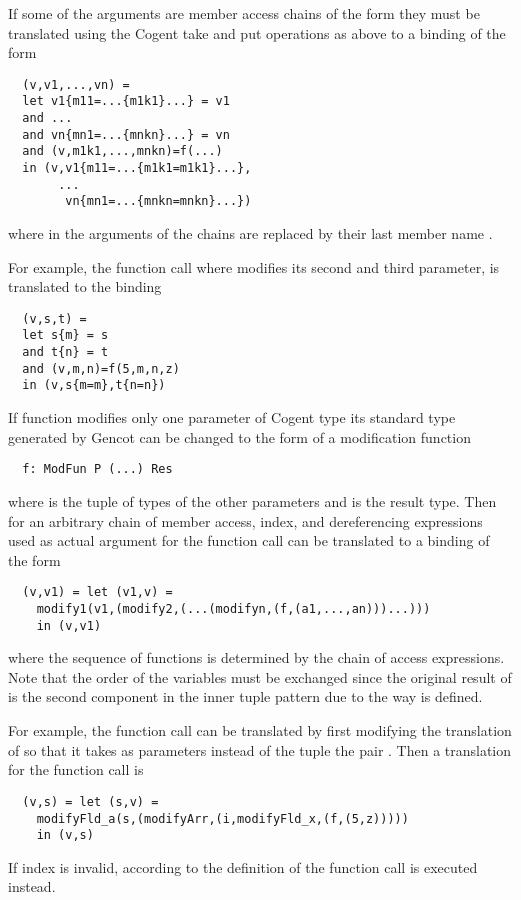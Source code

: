 If some of the arguments are member access chains of the form  they must be translated using the 
Cogent take and put operations as above to a binding of the form
\begin{verbatim}
  (v,v1,...,vn) = 
  let v1{m11=...{m1k1}...} = v1
  and ... 
  and vn{mn1=...{mnkn}...} = vn
  and (v,m1k1,...,mnkn)=f(...)
  in (v,v1{m11=...{m1k1=m1k1}...},
       ...
        vn{mn1=...{mnkn=mnkn}...})
\end{verbatim}
where in the arguments of  the chains are replaced by their last member name .

For example, the function call  where  modifies its second and third parameter, is translated
to the binding
\begin{verbatim}
  (v,s,t) = 
  let s{m} = s
  and t{n} = t
  and (v,m,n)=f(5,m,n,z)
  in (v,s{m=m},t{n=n})
\end{verbatim}

If function  modifies only one parameter  of Cogent type  its standard type generated by
Gencot can be changed to the form of a modification function
\begin{verbatim}
  f: ModFun P (...) Res
\end{verbatim}
where  is the tuple of types of the other parameters and  is the result type. Then for an arbitrary
chain of member access, index, and dereferencing expressions used as actual argument for  the function call 
can be translated to a binding of the form
\begin{verbatim}
  (v,v1) = let (v1,v) = 
    modify1(v1,(modify2,(...(modifyn,(f,(a1,...,an)))...)))
    in (v,v1)
\end{verbatim}
where the sequence of  functions is determined by the chain of access expressions. Note
that the order of the variables must be exchanged since the original result of  is the second component in 
the inner tuple pattern due to the way  is defined.

For example, the function call  can be translated by first modifying the translation of 
 so that it takes as parameters instead of the tuple  the pair . Then a translation
for the function call is
\begin{verbatim}
  (v,s) = let (s,v) = 
    modifyFld_a(s,(modifyArr,(i,modifyFld_x,(f,(5,z)))))
    in (v,s)
\end{verbatim}
If index  is invalid, according to the definition of  the function call  
is executed instead.

